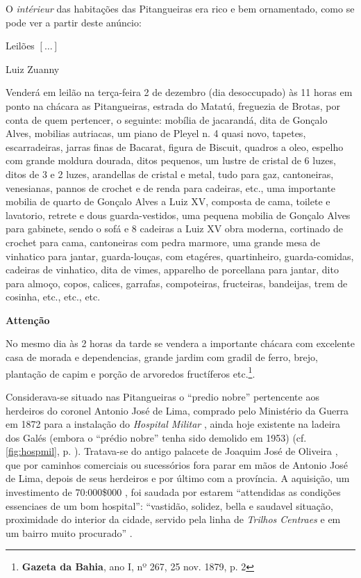 O \textit{intérieur} das habitações das Pitangueiras era rico e bem ornamentado, como se pode ver a partir deste anúncio:

\begin{citacao}
Leilões \([\dots]\)

Luiz Zuanny 

Venderá em leilão na terça-feira 2 de dezembro (dia desoccupado) às 11 horas em ponto na chácara as Pitangueiras, estrada do Matatú, freguezia de Brotas, por conta de quem pertencer, o seguinte: mobília de jacarandá, dita de Gonçalo Alves, mobilias autriacas, um piano de Pleyel n. 4 quasi novo, tapetes, escarradeiras, jarras finas de Bacarat, figura de Biscuit, quadros a oleo, espelho com grande moldura dourada, ditos pequenos, um lustre de cristal de 6 luzes, ditos de 3 e 2 luzes, arandellas de cristal e metal, tudo para gaz, cantoneiras, venesianas, pannos de crochet e de renda para cadeiras, etc., uma importante mobilia de quarto de Gonçalo Alves a Luiz XV, composta de cama, toilete e lavatorio, retrete e dous guarda-vestidos, uma pequena mobilia de Gonçalo Alves para gabinete, sendo o sofá e 8 cadeiras a Luiz XV obra moderna, cortinado de crochet para cama, cantoneiras com pedra marmore, uma grande mesa de vinhatico para jantar, guarda-louças, com etagéres, quartinheiro, guarda-comidas, cadeiras de vinhatico, dita de vimes, apparelho de porcellana para jantar, dito para almoço, copos, calices, garrafas, compoteiras, fructeiras, bandeijas, trem de cosinha, etc., etc., etc.

\textbf{Attenção}

No mesmo dia às 2 horas da tarde se vendera a importante chácara com excelente casa de morada e dependencias, grande jardim com gradil de ferro, brejo, plantação de capim e porção de arvoredos fructíferos etc.\footnote{\textbf{Gazeta da Bahia}, ano I, nº 267, 25 nov. 1879, p. 2}.
\end{citacao}

Considerava-se situado nas Pitangueiras o ``predio nobre'' pertencente aos herdeiros do coronel Antonio José de Lima, comprado pelo Ministério da Guerra em 1872 para a instalação do \textit{Hospital Militar} \cite[p.~30]{bahia_1872}, ainda hoje existente na ladeira dos Galés (embora o ``prédio nobre'' tenha sido demolido em 1953) (cf. \autoref{fig:hospmil}, p. \pageref{fig:hospmil}). Tratava-se do antigo palacete de Joaquim José de Oliveira \cite[p.~36]{bahia_rpe_1874}, que por caminhos comerciais ou sucessórios fora parar em mãos de Antonio José de Lima, depois de seus herdeiros e por último com a província. A aquisição, um investimento de 70:000\$000 \cite[p.~10]{bahia_1872}, foi saudada por estarem ``attendidas as condições essenciaes de um bom hospital'': ``vastidão, solidez, bella e saudavel situação, proximidade do interior da cidade, servido pela linha de \textit{Trilhos Centraes} e em um bairro muito procurado'' \cite[p.~31]{bahia_1872}.

